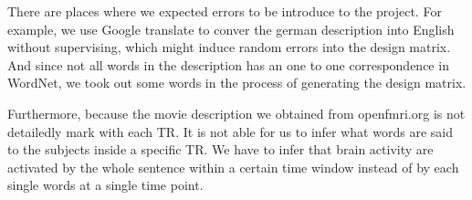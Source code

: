 \par
There are places where we expected errors to be introduce to the project. For example, we use Google translate to conver the german description into English without supervising, which might induce random errors into the design matrix. And since not all words in the description has an one to one correspondence in WordNet, we took out some words in the process of generating the design matrix.

Furthermore, because the movie description we obtained from openfmri.org is not detailedly mark with each TR. It is not able for us to infer what words are said to the subjects inside a specific TR. We have to infer that brain activity are activated by the whole sentence within a certain time window instead of by each single words at a single time point.